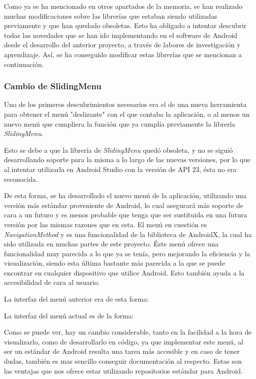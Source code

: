 Como ya se ha mencionado en otros apartados de la memoria, se han realizado muchas modificaciones sobre las librerías que estaban siendo utilizadas previamente y que han quedado obsoletas. Esto ha obligado a intentar descubrir todas las novedades que se han ido implementando en el software de Android desde el desarrollo del anterior proyecto, a través de labores de investigación y aprendizaje. Así, se ha conseguido modificar estas librerías que se mencionan a continuación.

\subsubsection{Cambio de SlidingMenu}

Uno de los primeros descubrimientos necesarios era el de una nueva herramienta para obtener el menú "deslizante" con el que contaba la aplicación, o al menos un nuevo menú que cumpliera la función que ya cumplía previamente la librería \textit{SlidingMenu}.

Esto se debe a que la librería de \textit{SlidingMenu} quedó obsoleta, y no se siguió desarrollando soporte para la misma a lo largo de las nuevas versiones, por lo que al intentar utilizarla en Android Studio con la versión de API 23, ésta no era reconocida.

De esta forma, se ha desarrollado el nuevo menú de la aplicación, utilizando una versión más estándar proveniente de Android, lo cual asegurará más soporte de cara a un futuro y es menos probable que tenga que ser sustituida en una futura versión por las mismas razones que en esta. El menú en cuestión es \textit{NavigationMethod} y es una funcionalidad de la biblioteca de AndroidX, la cual ha sido utilizada en muchas partes de este proyecto. Éste menú ofrece una funcionalidad muy parecida a lo que ya se tenía, pero mejorando la eficiencia y la visualización, siendo esta última bastante más parecida a la que se puede encontrar en cualquier dispositivo que utilice Android. Esto también ayuda a la accesibilidad de cara al usuario.

La interfaz del menú anterior era de esta forma:


La interfaz del menú actual es de la forma:


Como se puede ver, hay un cambio considerable, tanto en la facilidad a la hora de visualizarlo, como de desarrollarlo en código, ya que implementar este menú, al ser un estándar de Android resulta una tarea más accesible y en caso de tener dudas, también es mas sencillo conseguir documentación al respecto. Estas son las ventajas que nos ofrece estar utilizando repositorios estándar para Android.

